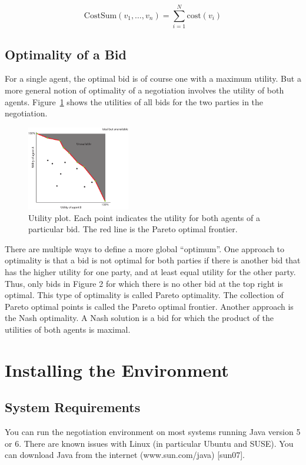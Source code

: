 \documentclass[]{article}
\begin{document}
\begin{equation}
	\text{CostSum}(v_1, \ldots, v_n) = \sum_{i=1}^{N} \text{cost}(v_i)
\end{equation}

\subsection{Optimality of a Bid}
For a single agent, the optimal bid is of course one with a maximum utility. But a more general notion of optimality of a negotiation involves the utility of both agents. Figure~\ref{Fig:utility plot} shows the utilities of all bids for the two parties in the negotiation. 
 
\begin{figure}[htb]
	\centering
	\includegraphics[width=0.4\textwidth]{media/image5.pdf}
\caption{Utility plot. Each point indicates the utility for both agents of a particular bid. The red line is the Pareto optimal frontier.}\label{Fig:utility plot}
\end{figure}

There are multiple ways to define a more global ``optimum''. One approach to optimality is that a bid is not optimal for both parties if there is another bid that has the higher utility for one party, and at least equal utility for the other party. Thus, only bids in Figure 2 for which there is no other bid at the top right is optimal. This type of optimality is called Pareto optimality. The collection of Pareto optimal points is called the Pareto optimal frontier. Another approach is the Nash optimality. A Nash solution is a bid for which the product of the utilities of both agents is maximal. 
 
\section{Installing the Environment}

\subsection{System Requirements}
You can run the negotiation environment on most systems running Java version 5 or 6. There are known issues with Linux (in particular Ubuntu and SUSE). You can download Java from the internet (www.sun.com/java) [sun07]. 
\end{document}
